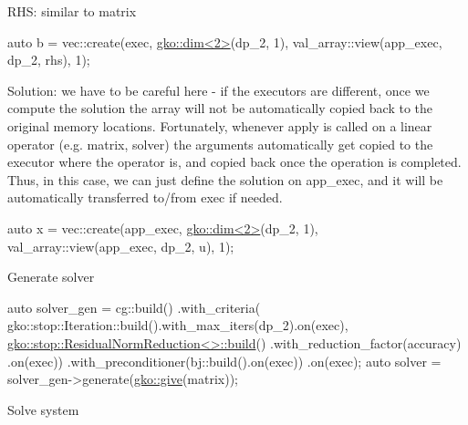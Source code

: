 R\+HS\+: similar to matrix


\begin{DoxyCode}
\textcolor{keyword}{auto} b = vec::create(exec, \hyperlink{structgko_1_1dim}{gko::dim<2>}(dp\_2, 1),
                     val\_array::view(app\_exec, dp\_2, rhs), 1);
\end{DoxyCode}


Solution\+: we have to be careful here -\/ if the executors are different, once we compute the solution the array will not be automatically copied back to the original memory locations. Fortunately, whenever {\ttfamily apply} is called on a linear operator (e.\+g. matrix, solver) the arguments automatically get copied to the executor where the operator is, and copied back once the operation is completed. Thus, in this case, we can just define the solution on {\ttfamily app\+\_\+exec}, and it will be automatically transferred to/from {\ttfamily exec} if needed.


\begin{DoxyCode}
\textcolor{keyword}{auto} x = vec::create(app\_exec, \hyperlink{structgko_1_1dim}{gko::dim<2>}(dp\_2, 1),
                     val\_array::view(app\_exec, dp\_2, u), 1);
\end{DoxyCode}


Generate solver


\begin{DoxyCode}
\textcolor{keyword}{auto} solver\_gen =
    cg::build()
        .with\_criteria(
            gko::stop::Iteration::build().with\_max\_iters(dp\_2).on(exec),
            \hyperlink{classgko_1_1stop_1_1ResidualNormReduction}{gko::stop::ResidualNormReduction<>::build}()
                .with\_reduction\_factor(accuracy)
                .on(exec))
        .with\_preconditioner(bj::build().on(exec))
        .on(exec);
\textcolor{keyword}{auto} solver = solver\_gen->generate(\hyperlink{namespacegko_acbd3fd6d07e498892881e8e2ab0b4167}{gko::give}(matrix));
\end{DoxyCode}


Solve system


